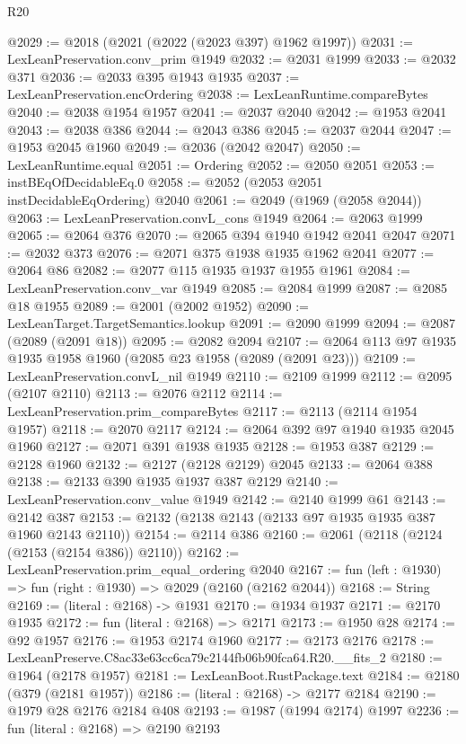 \begin{lexlean}{R20}
\begin{coremodule}
@2029 := @2018 (@2021 (@2022 (@2023 @397) @1962 @1997))
@2031 := LexLeanPreservation.conv_prim @1949
@2032 := @2031 @1999
@2033 := @2032 @371
@2036 := @2033 @395 @1943 @1935
@2037 := LexLeanPreservation.encOrdering
@2038 := LexLeanRuntime.compareBytes
@2040 := @2038 @1954 @1957
@2041 := @2037 @2040
@2042 := @1953 @2041
@2043 := @2038 @386
@2044 := @2043 @386
@2045 := @2037 @2044
@2047 := @1953 @2045 @1960
@2049 := @2036 (@2042 @2047)
@2050 := LexLeanRuntime.equal
@2051 := Ordering
@2052 := @2050 @2051
@2053 := instBEqOfDecidableEq.{0}
@2058 := @2052 (@2053 @2051 instDecidableEqOrdering) @2040
@2061 := @2049 (@1969 (@2058 @2044))
@2063 := LexLeanPreservation.convL_cons @1949
@2064 := @2063 @1999
@2065 := @2064 @376
@2070 := @2065 @394 @1940 @1942 @2041 @2047
@2071 := @2032 @373
@2076 := @2071 @375 @1938 @1935 @1962 @2041
@2077 := @2064 @86
@2082 := @2077 @115 @1935 @1937 @1955 @1961
@2084 := LexLeanPreservation.conv_var @1949
@2085 := @2084 @1999
@2087 := @2085 @18 @1955
@2089 := @2001 (@2002 @1952)
@2090 := LexLeanTarget.TargetSemantics.lookup
@2091 := @2090 @1999
@2094 := @2087 (@2089 (@2091 @18))
@2095 := @2082 @2094
@2107 := @2064 @113 @97 @1935 @1935 @1958 @1960 (@2085 @23 @1958 (@2089 (@2091 @23)))
@2109 := LexLeanPreservation.convL_nil @1949
@2110 := @2109 @1999
@2112 := @2095 (@2107 @2110)
@2113 := @2076 @2112
@2114 := LexLeanPreservation.prim_compareBytes
@2117 := @2113 (@2114 @1954 @1957)
@2118 := @2070 @2117
@2124 := @2064 @392 @97 @1940 @1935 @2045 @1960
@2127 := @2071 @391 @1938 @1935
@2128 := @1953 @387
@2129 := @2128 @1960
@2132 := @2127 (@2128 @2129) @2045
@2133 := @2064 @388
@2138 := @2133 @390 @1935 @1937 @387 @2129
@2140 := LexLeanPreservation.conv_value @1949
@2142 := @2140 @1999 @61
@2143 := @2142 @387
@2153 := @2132 (@2138 @2143 (@2133 @97 @1935 @1935 @387 @1960 @2143 @2110))
@2154 := @2114 @386
@2160 := @2061 (@2118 (@2124 (@2153 (@2154 @386)) @2110))
@2162 := LexLeanPreservation.prim_equal_ordering @2040
@2167 := fun (left : @1930) => fun (right : @1930) => @2029 (@2160 (@2162 @2044))
@2168 := String
@2169 := (literal : @2168) -> @1931
@2170 := @1934 @1937
@2171 := @2170 @1935
@2172 := fun (literal : @2168) => @2171
@2173 := @1950 @28
@2174 := @92 @1957
@2176 := @1953 @2174 @1960
@2177 := @2173 @2176
@2178 := LexLeanPreserve.C8ac33e63cc6ca79c2144fb06b90fca64.R20.__fits_2
@2180 := @1964 (@2178 @1957)
@2181 := LexLeanBoot.RustPackage.text
@2184 := @2180 (@379 (@2181 @1957))
@2186 := (literal : @2168) -> @2177 @2184
@2190 := @1979 @28 @2176 @2184 @408
@2193 := @1987 (@1994 @2174) @1997
@2236 := fun (literal : @2168) =>
  @2190
    @2193

\end{coremodule}
\end{lexlean}
